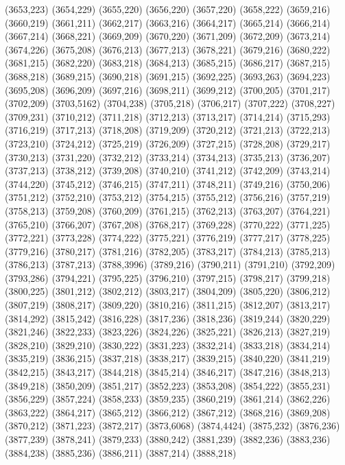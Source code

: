 (3653,223)
(3654,229)
(3655,220)
(3656,220)
(3657,220)
(3658,222)
(3659,216)
(3660,219)
(3661,211)
(3662,217)
(3663,216)
(3664,217)
(3665,214)
(3666,214)
(3667,214)
(3668,221)
(3669,209)
(3670,220)
(3671,209)
(3672,209)
(3673,214)
(3674,226)
(3675,208)
(3676,213)
(3677,213)
(3678,221)
(3679,216)
(3680,222)
(3681,215)
(3682,220)
(3683,218)
(3684,213)
(3685,215)
(3686,217)
(3687,215)
(3688,218)
(3689,215)
(3690,218)
(3691,215)
(3692,225)
(3693,263)
(3694,223)
(3695,208)
(3696,209)
(3697,216)
(3698,211)
(3699,212)
(3700,205)
(3701,217)
(3702,209)
(3703,5162)
(3704,238)
(3705,218)
(3706,217)
(3707,222)
(3708,227)
(3709,231)
(3710,212)
(3711,218)
(3712,213)
(3713,217)
(3714,214)
(3715,293)
(3716,219)
(3717,213)
(3718,208)
(3719,209)
(3720,212)
(3721,213)
(3722,213)
(3723,210)
(3724,212)
(3725,219)
(3726,209)
(3727,215)
(3728,208)
(3729,217)
(3730,213)
(3731,220)
(3732,212)
(3733,214)
(3734,213)
(3735,213)
(3736,207)
(3737,213)
(3738,212)
(3739,208)
(3740,210)
(3741,212)
(3742,209)
(3743,214)
(3744,220)
(3745,212)
(3746,215)
(3747,211)
(3748,211)
(3749,216)
(3750,206)
(3751,212)
(3752,210)
(3753,212)
(3754,215)
(3755,212)
(3756,216)
(3757,219)
(3758,213)
(3759,208)
(3760,209)
(3761,215)
(3762,213)
(3763,207)
(3764,221)
(3765,210)
(3766,207)
(3767,208)
(3768,217)
(3769,228)
(3770,222)
(3771,225)
(3772,221)
(3773,228)
(3774,222)
(3775,221)
(3776,219)
(3777,217)
(3778,225)
(3779,216)
(3780,217)
(3781,216)
(3782,205)
(3783,217)
(3784,213)
(3785,213)
(3786,213)
(3787,213)
(3788,3996)
(3789,216)
(3790,211)
(3791,210)
(3792,209)
(3793,286)
(3794,221)
(3795,225)
(3796,210)
(3797,215)
(3798,217)
(3799,218)
(3800,225)
(3801,212)
(3802,212)
(3803,217)
(3804,209)
(3805,220)
(3806,212)
(3807,219)
(3808,217)
(3809,220)
(3810,216)
(3811,215)
(3812,207)
(3813,217)
(3814,292)
(3815,242)
(3816,228)
(3817,236)
(3818,236)
(3819,244)
(3820,229)
(3821,246)
(3822,233)
(3823,226)
(3824,226)
(3825,221)
(3826,213)
(3827,219)
(3828,210)
(3829,210)
(3830,222)
(3831,223)
(3832,214)
(3833,218)
(3834,214)
(3835,219)
(3836,215)
(3837,218)
(3838,217)
(3839,215)
(3840,220)
(3841,219)
(3842,215)
(3843,217)
(3844,218)
(3845,214)
(3846,217)
(3847,216)
(3848,213)
(3849,218)
(3850,209)
(3851,217)
(3852,223)
(3853,208)
(3854,222)
(3855,231)
(3856,229)
(3857,224)
(3858,233)
(3859,235)
(3860,219)
(3861,214)
(3862,226)
(3863,222)
(3864,217)
(3865,212)
(3866,212)
(3867,212)
(3868,216)
(3869,208)
(3870,212)
(3871,223)
(3872,217)
(3873,6068)
(3874,4424)
(3875,232)
(3876,236)
(3877,239)
(3878,241)
(3879,233)
(3880,242)
(3881,239)
(3882,236)
(3883,236)
(3884,238)
(3885,236)
(3886,211)
(3887,214)
(3888,218)
